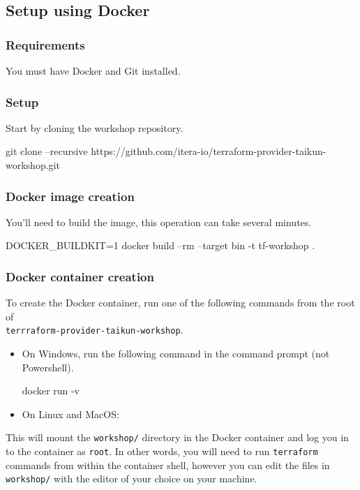 \subsection{Setup using Docker}\label{sec:docker}

\subsubsection{Requirements}
You must have Docker and Git installed.

\subsubsection{Setup}
Start by cloning the workshop repository.
\begin{shell}
git clone --recursive https://github.com/itera-io/terraform-provider-taikun-workshop.git
\end{shell}

\subsubsection{Docker image creation}
You'll need to build the image, this operation can take several minutes.
\begin{shell}
DOCKER_BUILDKIT=1 docker build --rm --target bin -t tf-workshop .
\end{shell}

\subsubsection{Docker container creation}
To create the Docker container, run one of the following commands from the root of \\
\texttt{terrraform-provider-taikun-workshop}.
\begin{itemize}
  \item On Windows, run the following command in the command prompt (not Powershell).
  \begin{cmd}
docker run -v %
  \end{cmd}
  \item On Linux and MacOS:
\end{itemize}
This will mount the \texttt{workshop/} directory in the Docker container and
log you in to the container as \texttt{root}.
In other words, you will need to run \texttt{terraform} commands from within
the container shell, however you can edit the files in \texttt{workshop/}
with the editor of your choice on your machine.\\

